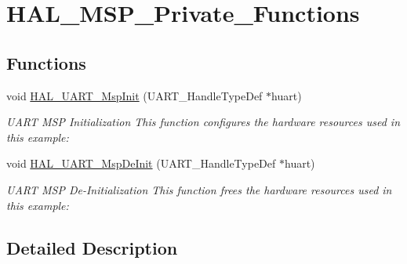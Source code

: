 \hypertarget{group__HAL__MSP__Private__Functions}{\section{H\-A\-L\-\_\-\-M\-S\-P\-\_\-\-Private\-\_\-\-Functions}
\label{group__HAL__MSP__Private__Functions}
}
\subsection*{Functions}
\begin{DoxyCompactItemize}
\item 
void \hyperlink{group__HAL__MSP__Private__Functions_ga0e553b32211877322f949b14801bbfa7}{H\-A\-L\-\_\-\-U\-A\-R\-T\-\_\-\-Msp\-Init} (U\-A\-R\-T\-\_\-\-Handle\-Type\-Def $\ast$huart)
\begin{DoxyCompactList}\small\item\em U\-A\-R\-T M\-S\-P Initialization This function configures the hardware resources used in this example\-: \end{DoxyCompactList}\item 
void \hyperlink{group__HAL__MSP__Private__Functions_ga718f39804e3b910d738a0e1e46151188}{H\-A\-L\-\_\-\-U\-A\-R\-T\-\_\-\-Msp\-De\-Init} (U\-A\-R\-T\-\_\-\-Handle\-Type\-Def $\ast$huart)
\begin{DoxyCompactList}\small\item\em U\-A\-R\-T M\-S\-P De-\/\-Initialization This function frees the hardware resources used in this example\-: \end{DoxyCompactList}\end{DoxyCompactItemize}


\subsection{Detailed Description}


